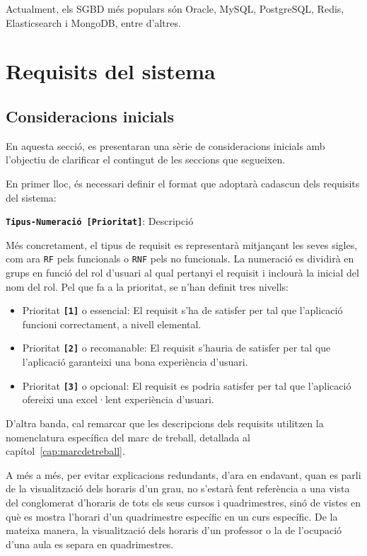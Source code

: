 \documentclass[a4paper,12pt]{ThesisStyle}
\begin{document}
Actualment, els SGBD més populars són Oracle, MySQL, PostgreSQL, Redis, Elasticsearch i MongoDB, entre d'altres.


\chapter{Requisits del sistema}
\label{cap:requisits}

\section{Consideracions inicials}
\label{sec:consideracions_inicials}

En aquesta secció, es presentaran una sèrie de consideracions inicials amb l'objectiu de clarificar el contingut de les seccions que segueixen.

En primer lloc, és necessari definir el format que adoptarà cadascun dels requisits del sistema:
\\[8pt]
\centerline{\texttt{\textbf{Tipus-Numeració [Prioritat]}}: Descripció}

Més concretament, el tipus de requisit es representarà mitjançant les seves sigles, com ara \texttt{RF} pels funcionals o \texttt{RNF} pels no funcionals. La numeració es dividirà en grups en funció del rol d'usuari al qual pertanyi el requisit i inclourà la inicial del nom del rol. Pel que fa a la prioritat, se n'han definit tres nivells:
\begin{itemize}
  \item Prioritat \texttt{\textbf{[1]}} o essencial: El requisit s'ha de satisfer per tal que l'aplicació funcioni correctament, a nivell elemental.
  \item Prioritat \texttt{\textbf{[2]}} o recomanable: El requisit s'hauria de satisfer per tal que l'aplicació garanteixi una bona experiència d'usuari.
  \item Prioritat \texttt{\textbf{[3]}} o opcional: El requisit es podria satisfer per tal que l'aplicació ofereixi una excel·lent experiència d'usuari.
\end{itemize}

D'altra banda, cal remarcar que les descripcions dels requisits utilitzen la nomenclatura específica del marc de treball, detallada al capítol~\ref{cap:marcdetreball}.

A més a més, per evitar explicacions redundants, d'ara en endavant, quan es parli de la visualització dels horaris d'un grau, no s'estarà fent referència a una vista del conglomerat d'horaris de tots els seus cursos i quadrimestres, sinó de vistes en què es mostra l'horari d'un quadrimestre específic en un curs específic. De la mateixa manera, la visualització dels horaris d'un professor o la de l'ocupació d'una aula es separa en quadrimestres.
\end{document}
